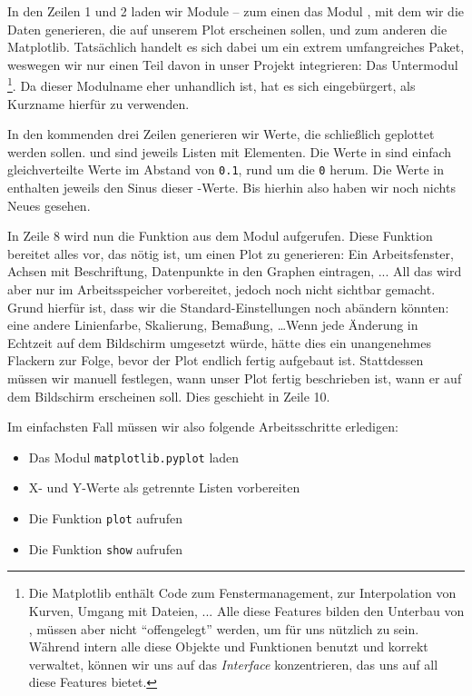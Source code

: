 In den Zeilen 1 und 2 laden wir Module -- zum einen das Modul , mit dem wir die Daten generieren, die auf unserem Plot erscheinen sollen, und zum anderen die Matplotlib. Tatsächlich handelt es sich dabei um ein extrem umfangreiches Paket, weswegen wir nur einen Teil davon in unser Projekt integrieren: Das Untermodul \footnote{Die Matplotlib enthält Code zum Fenstermanagement, zur Interpolation von Kurven, Umgang mit Dateien, ... Alle diese Features bilden den Unterbau von , müssen aber nicht \enquote{offengelegt} werden, um für uns nützlich zu sein. Während  intern alle diese Objekte und Funktionen benutzt und korrekt verwaltet, können wir uns auf das \emph{Interface} konzentrieren, das uns  auf all diese Features bietet.}. Da dieser Modulname  eher unhandlich ist, hat es sich eingebürgert,  als Kurzname hierfür zu verwenden.

In den kommenden drei Zeilen generieren wir Werte, die schließlich geplottet werden sollen.  und  sind jeweils Listen mit  Elementen. Die Werte in  sind einfach gleichverteilte Werte im Abstand von \texttt{0.1}, rund um die \texttt{0} herum. Die Werte in  enthalten jeweils den Sinus dieser -Werte. Bis hierhin also haben wir noch nichts Neues gesehen.

In Zeile 8 wird nun die Funktion  aus dem Modul  aufgerufen. Diese Funktion bereitet alles vor, das nötig ist, um einen Plot zu generieren: Ein Arbeitsfenster, Achsen mit Beschriftung, Datenpunkte in den Graphen eintragen, ... All das wird aber nur im Arbeitsspeicher vorbereitet, jedoch noch nicht sichtbar gemacht. Grund hierfür ist, dass wir die Standard-Einstellungen noch abändern könnten: eine andere Linienfarbe, Skalierung, Bemaßung, \ldots Wenn jede Änderung in Echtzeit auf dem Bildschirm umgesetzt würde, hätte dies ein unangenehmes Flackern zur Folge, bevor der Plot endlich fertig aufgebaut ist. Stattdessen müssen wir manuell festlegen, wann unser Plot fertig beschrieben ist, \ie wann er auf dem Bildschirm erscheinen soll. Dies geschieht in Zeile 10.

Im einfachsten Fall müssen wir also folgende Arbeitsschritte erledigen:
\begin{itemize}
\item Das Modul \texttt{matplotlib.pyplot} laden
\item X- und Y-Werte als getrennte Listen vorbereiten
\item Die Funktion \texttt{plot} aufrufen
\item Die Funktion \texttt{show} aufrufen
\end{itemize}

